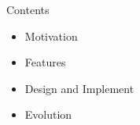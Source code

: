 \begin{frame}
  \titlepage
\end{frame}

\begin{frame}{Contents}
    \begin{itemize}
    \item \alert{Motivation}
    \item \alert{Features}
    \item \alert{Design and Implement}
    \item \alert{Evolution}    
    \end{itemize}
\end{frame}
